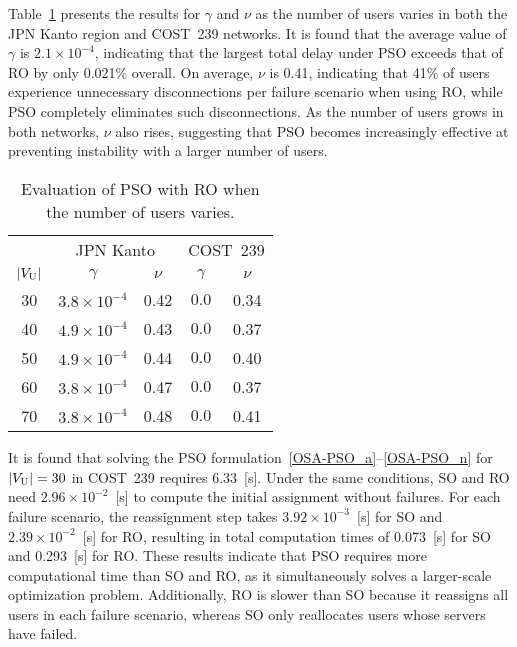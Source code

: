 \documentclass[conference]{IEEEtran}
\begin{document}
\begin{CJK}{UTF8}{ipxm}
Table~\ref{tab:OSA-PSO_gamma_nu} presents the results for $\gamma$ and $\nu$ as the number of users varies in both the JPN Kanto region and COST~239 networks.
It is found that the average value of $\gamma$ is $2.1 \times 10^{-4}$, indicating that the largest total delay under PSO exceeds that of RO by only 0.021\% overall.
On average, $\nu$ is 0.41, indicating that 41\% of users experience unnecessary disconnections per failure scenario when using RO, while PSO completely eliminates such disconnections.
As the number of users grows in both networks, $\nu$ also rises, suggesting that PSO becomes increasingly effective at preventing instability with a larger number of users.
\begin{table}[t]
  \caption{Evaluation of PSO with RO when the number of users varies.}
  \label{tab:OSA-PSO_gamma_nu}
  \vspace{-0.3cm}
  \begin{center}
    \begin{tabular}{c|cc|cc}
      \hline
      & \multicolumn{2}{c|}{JPN Kanto} & \multicolumn{2}{c}{COST~239} \\ \cline{2-5}
      $|V_{\rm{U}}|$ & $\gamma$ & $\nu$ & $\gamma$ & $\nu$ \\
      \hline
      30 & $3.8 \times 10^{-4}$ & 0.42 & $0.0$ & 0.34 \\
      40 & $4.9 \times 10^{-4}$ & 0.43 & $0.0$ & 0.37 \\
      50 & $4.9 \times 10^{-4}$ & 0.44 & $0.0$ & 0.40 \\
      60 & $3.8 \times 10^{-4}$ & 0.47 & $0.0$ & 0.37 \\
      70 & $3.8 \times 10^{-4}$ & 0.48 & $0.0$ & 0.41 \\
      \hline
    \end{tabular}
  \end{center}
\end{table}

It is found that solving the PSO formulation~\eqref{OSA-PSO_a}--\eqref{OSA-PSO_n} for $|V_{\rm U}|=30$ in COST~239 requires 6.33~[s].
Under the same conditions, SO and RO need $2.96 \times 10^{-2}$~[s] to compute the initial assignment without failures.
For each failure scenario, the reassignment step takes $3.92 \times 10^{-3}$~[s] for SO and $2.39 \times 10^{-2}$~[s] for RO, resulting in total computation times of 0.073~[s] for SO and 0.293~[s] for RO.
These results indicate that PSO requires more computational time than SO and RO, as it simultaneously solves a larger-scale optimization problem.
Additionally, RO is slower than SO because it reassigns all users in each failure scenario, whereas SO only reallocates users whose servers have failed.


\end{CJK}
\end{document}
